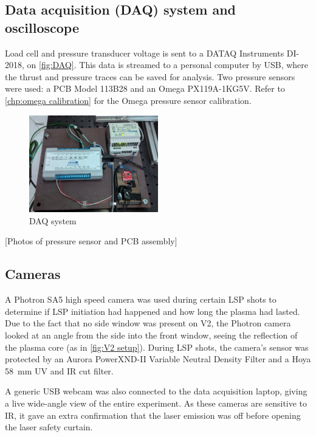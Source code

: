         \subsection{Data acquisition (DAQ) system and oscilloscope}

            Load cell and pressure transducer voltage is sent to a DATAQ Instruments DI-2018, on \autoref{fig:DAQ}. This data is streamed to a personal computer by USB, where the thrust and pressure traces can be saved for analysis. Two pressure sensors were used: a PCB Model 113B28 and an Omega PX119A-1KG5V. Refer to \autoref{chp:omega calibration} for the Omega pressure sensor calibration.

            \begin{figure}[!ht]
                \centering
                \includegraphics[width=0.50\textwidth]{assets/3 design/DAQ electronics.jpg}
                \caption{DAQ system}
                \label{fig:DAQ}
            \end{figure}

            [Photos of pressure sensor and PCB assembly]

        \subsection{Cameras}

            A Photron SA5 high speed camera was used during certain LSP shots to determine if LSP initiation had happened and how long the plasma had lasted. Due to the fact that no side window was present on V2, the Photron camera looked at an angle from the side into the front window, seeing the reflection of the plasma core (as in \autoref{fig:V2 setup}). During LSP shots, the camera's sensor was protected by an Aurora PowerXND-II Variable Neutral Density Filter and a Hoya \qty{58}{mm} UV and IR cut filter.

            A generic USB webcam was also connected to the data acquisition laptop, giving a live wide-angle view of the entire experiment. As these cameras are sensitive to IR, it gave an extra confirmation that the laser emission was off before opening the laser safety curtain.

